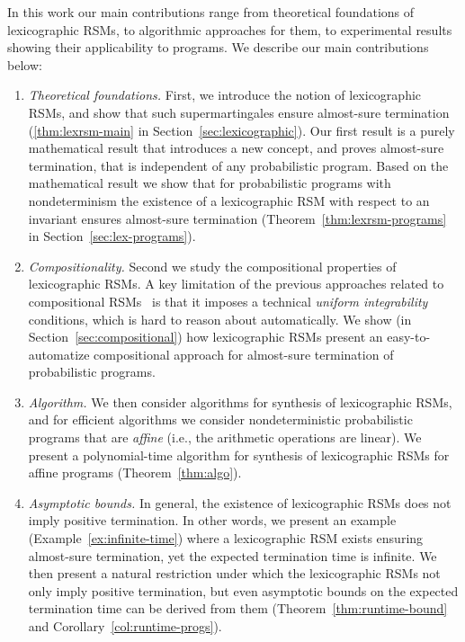 \smallskip{} 
In this work our main contributions range from theoretical foundations of lexicographic
RSMs, to algorithmic approaches for them, to experimental results
showing their applicability to programs.
We describe our main contributions below:
\begin{enumerate}

\item {\em Theoretical foundations.} 
First, we introduce the notion of lexicographic RSMs, and show that
such supermartingales ensure almost-sure termination (\ref{thm:lexrsm-main} in 
Section~\ref{sec:lexicographic}). 
Our first result is a purely mathematical result that introduces a new concept, and 
proves almost-sure termination, that is independent of any probabilistic program.
Based on the mathematical result we show that for probabilistic programs with 
nondeterminism
the existence of a lexicographic RSM with respect to an invariant ensures
almost-sure termination (Theorem~\ref{thm:lexrsm-programs} in 
Section~\ref{sec:lex-programs}).

\item {\em Compositionality.} 
Second we study the compositional properties of lexicographic RSMs.
A key limitation of the previous approaches related to compositional 
RSMs~\cite{HolgerPOPL} is that it imposes a technical \emph{uniform 
integrability} conditions, which is hard to reason about automatically. We show 
(in Section~\ref{sec:compositional}) how 
lexicographic RSMs 
present an easy-to-automatize compositional approach for almost-sure 
termination of probabilistic programs.

\item {\em Algorithm.} We then consider algorithms for synthesis of lexicographic RSMs, 
and for efficient algorithms we consider nondeterministic probabilistic 
programs that are {\em affine} (i.e., the arithmetic operations are linear).
We present a polynomial-time algorithm for synthesis of lexicographic RSMs 
for affine programs (Theorem~\ref{thm:algo}).


\item {\em Asymptotic bounds.} 
In general, the existence of lexicographic RSMs does not imply positive
termination. 
In other words, we present an example (Example~\ref{ex:infinite-time}) where a 
lexicographic RSM exists ensuring
almost-sure termination, yet the expected termination time is infinite.
We then present a natural restriction under which the lexicographic 
RSMs not only imply positive termination, but even asymptotic bounds on the expected termination 
time can be derived from them (Theorem~\ref{thm:runtime-bound} and 
Corollary~\ref{col:runtime-progs}).



\end{enumerate}
